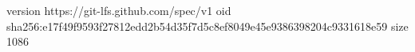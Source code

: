 version https://git-lfs.github.com/spec/v1
oid sha256:e17f49f9593f27812edd2b54d35f7d5c8ef8049e45e9386398204c9331618e59
size 1086
